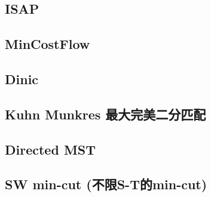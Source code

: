 \documentclass[a4paper,10pt,twocolumn,oneside]{article}
\begin{document}
\subsection{ISAP}


\subsection{MinCostFlow}


\subsection{Dinic}


%

%

\subsection{Kuhn Munkres 最大完美二分匹配}


\subsection{Directed MST}


\subsection{SW min-cut (不限S-T的min-cut)}


% 

%
\end{document}
